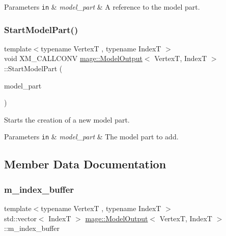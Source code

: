 \begin{DoxyParams}[1]{Parameters}
\mbox{\tt in}  & {\em model\+\_\+part} & A reference to the model part. \\
\hline
\end{DoxyParams}
\hypertarget{structmage_1_1_model_output_a204f16513741ebfacb7a287969629956}{}\label{structmage_1_1_model_output_a204f16513741ebfacb7a287969629956} 
\subsubsection{\texorpdfstring{Start\+Model\+Part()}{StartModelPart()}}
{\footnotesize\ttfamily template$<$typename VertexT , typename IndexT $>$ \\
void X\+M\+\_\+\+C\+A\+L\+L\+C\+O\+NV \hyperlink{structmage_1_1_model_output}{mage\+::\+Model\+Output}$<$ VertexT, IndexT $>$\+::Start\+Model\+Part (\begin{DoxyParamCaption}\item[{\hyperlink{structmage_1_1_model_part}{Model\+Part}}]{model\+\_\+part }\end{DoxyParamCaption})}

Starts the creation of a new model part.


\begin{DoxyParams}[1]{Parameters}
\mbox{\tt in}  & {\em model\+\_\+part} & The model part to add. \\
\hline
\end{DoxyParams}


\subsection{Member Data Documentation}
\hypertarget{structmage_1_1_model_output_accf4483b85b26525e180e6ffd3678fc6}{}\label{structmage_1_1_model_output_accf4483b85b26525e180e6ffd3678fc6} 
\subsubsection{\texorpdfstring{m\+\_\+index\+\_\+buffer}{m\_index\_buffer}}
{\footnotesize\ttfamily template$<$typename VertexT , typename IndexT $>$ \\
std\+::vector$<$ IndexT $>$ \hyperlink{structmage_1_1_model_output}{mage\+::\+Model\+Output}$<$ VertexT, IndexT $>$\+::m\+\_\+index\+\_\+buffer}

